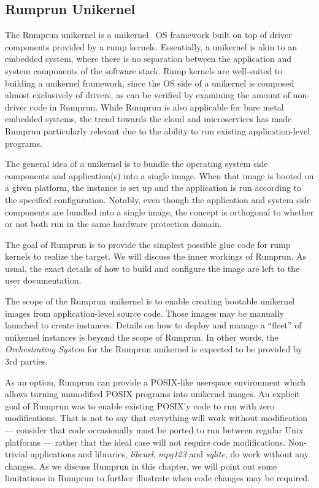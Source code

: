 \subsection{Rumprun Unikernel}
\label{sect:rumprun}

The Rumprun unikernel is a unikernel~\cite{unikernel} OS framework built
on top of driver components provided by a rump kernels.  Essentially,
a unikernel is akin to an embedded system, where there is no separation
between the application and system components of the software stack.
Rump kernels are well-suited to building a unikernel
framework, since the OS side of a unikernel is composed almost exclusively
of drivers, as can be verified by examining the amount of non-driver
code in Rumprun.  While Rumprun is also applicable for bare metal embedded
systems, the trend towards the cloud and microservices has made Rumprun
particularly relevant due to the ability to run existing application-level
programs.

The general idea of a unikernel is to bundle the operating system side
components and application(s) into a single image.  When that image is
booted on a given platform, the instance is set up and the application
is run according to the specified configuration.
Notably, even though the application and system side components are
bundled into a single image, the concept is orthogonal to whether or
not both run in the same hardware protection domain.

The goal of Rumprun is to provide the simplest possible glue code for
rump kernels to realize the target.  We will discuss the inner
workings of Rumprun.  As usual, the exact details of how to build and
configure the image are left to the user documentation.

The scope of the Rumprun unikernel is to enable creating bootable
unikernel images from application-level source code.  Those images may
be manually launched to create instances.  Details on how to deploy and
manage a ``fleet'' of unikernel instances is beyond the scope
of Rumprun.  In other words, the \textit{Orchestrating System} for the
Rumprun unikernel is expected to be provided by 3rd parties.

As an option, Rumprun can provide a POSIX-like userspace environment
which allows turning unmodified POSIX programs into unikernel images.
An explicit goal of Rumprun was to enable existing POSIX'y code
to run with zero modifications.  That is not to say that everything will
work without modification --- consider that code occasionally must be
ported to run between regular Unix platforms --- rather that the ideal case
will not require code modifications.  Non-trivial applications and
libraries, \eg \textit{libcurl}, \textit{mpg123} and \textit{sqlite},
do work without any changes.  As we discuss Rumprun in this chapter,
we will point out some limitations in Rumprun to further illustrate when
code changes may be required.

